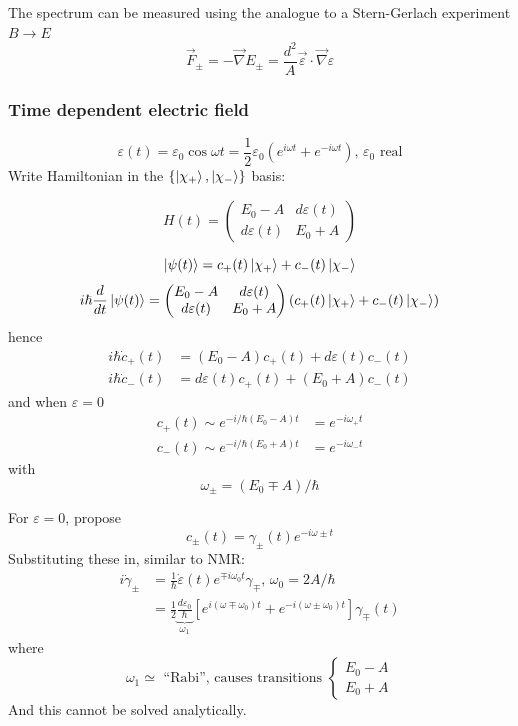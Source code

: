 \documentclass[12pt]{article}
\newcommand{\be}{\begin{equation}}
\newcommand{\ee}{\end{equation}}
\begin{document}
\setcounter{equation}{66}
The spectrum can be measured using the analogue
to a Stern-Gerlach experiment $B \to E$
\be
\vec{F}_\pm = -\vec{\nabla}E_\pm=
\frac{d^{2}}{A} \vec{\varepsilon} \cdot \vec{\nabla} \varepsilon
\ee


\subsubsection{Time dependent electric field}

\be
\varepsilon(t)=\varepsilon_{0} \cos \omega t=\frac{1}{2} \varepsilon_{0}\left(e^{i \omega t}+e^{-i \omega t}\right),
\, \varepsilon_{0}\text{ real}
\ee
Write Hamiltonian in the $\{\ket{\chi_+},\ket{\chi_-}\}$ basis:

\be
H(t)=\begin{pmatrix}
E_{0}-A & d \varepsilon(t) \\ 
d \varepsilon(t) & E_{0}+A
\end{pmatrix}
\ee

\be
\ket{\psi(t)} = c_+(t)\ket{\chi_+} + c_-(t)\ket{\chi_-}
\ee
\[
i\hbar \frac{d}{d t} \ket{\psi(t)} = 
\begin{pmatrix}
E_{0}-A & d \varepsilon(t) \\ 
d \varepsilon(t) & E_{0}+A
\end{pmatrix}
\left(
c_+(t)\ket{\chi_+} + c_-(t)\ket{\chi_-}
\right)
\]
hence
\be
\begin{aligned}
i \hbar \dot{c}_{+}(t)&=\left(E_{0}-A\right) c_{+}(t)+d \varepsilon(t) c_{-}(t) \\
i \hbar \dot{c}_{-}(t)&=d \varepsilon(t) c_{+}(t)+\left(E_{0}+A\right) c_{-}(t)
\end{aligned}
\ee
and when $\varepsilon = 0$
\be
\begin{aligned} 
c_{+}(t) \sim e^{-i / \hbar\left(E_{0}-A\right) t} &=e^{-i \omega_{+} t} \\ 
c_{-}(t) \sim e^{-i / \hbar\left(E_{0}+A\right) t} &=e^{-i \omega_{-} t} 
\end{aligned}
\ee
with
\be
\omega_{\pm}=\left(E_{0} \mp A\right) / \hbar
\ee


For $\varepsilon = 0$, propose
\be
c_{\pm}(t)=\gamma_{\pm}(t) e^{-i \omega \pm t}
\ee
Substituting these in, similar to NMR:
\be
\begin{aligned}
i \dot{\gamma}_{\pm}
&=\frac{1}{\hbar} \dot{\varepsilon}(t) e^{\mp i \omega_{0} t} \gamma_{\mp},\,
\boxed{
\omega_{0}=2 A / \hbar
}\\
&=\frac{1}{2} 
\underbrace{\frac{d \varepsilon_{0}}{\hbar}}%
_{\omega_1}
\left[
e^{ i\left(\omega\mp \omega_{0}\right) t}+
e^{-i\left(\omega\pm \omega_{0}\right) t}
\right] \gamma_{\mp}(t) 
\end{aligned}
\ee
where 
\be
\omega_1 \simeq \text{ ``Rabi'', causes transitions }
\left\{
\begin{gathered}
E_0-A\\
E_0+A
\end{gathered}
\right. 
\ee
And this cannot be solved analytically.
\end{document}
